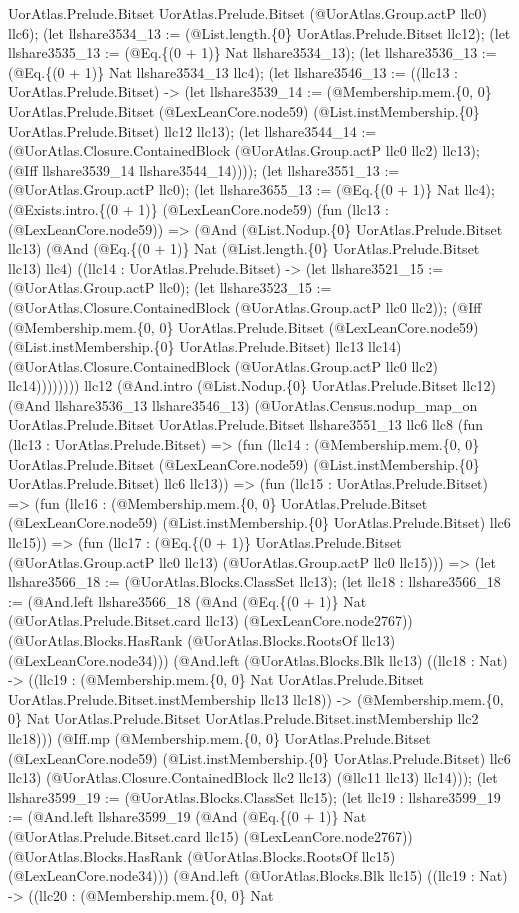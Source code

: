 \documentclass[11pt]{article}
\begin{document}
UorAtlas.Prelude.Bitset UorAtlas.Prelude.Bitset (@UorAtlas.Group.actP llc0) llc6); (let llshare3534\_13 := (@List.length.\{0\} UorAtlas.Prelude.Bitset llc12); (let llshare3535\_13 := (@Eq.\{(0 + 1)\} Nat llshare3534\_13); (let llshare3536\_13 := (@Eq.\{(0 + 1)\} Nat llshare3534\_13 llc4); (let llshare3546\_13 := ((llc13 : UorAtlas.Prelude.Bitset) -> (let llshare3539\_14 := (@Membership.mem.\{0, 0\} UorAtlas.Prelude.Bitset (@LexLeanCore.node59) (@List.instMembership.\{0\} UorAtlas.Prelude.Bitset) llc12 llc13); (let llshare3544\_14 := (@UorAtlas.Closure.ContainedBlock (@UorAtlas.Group.actP llc0 llc2) llc13); (@Iff llshare3539\_14 llshare3544\_14)))); (let llshare3551\_13 := (@UorAtlas.Group.actP llc0); (let llshare3655\_13 := (@Eq.\{(0 + 1)\} Nat llc4); (@Exists.intro.\{(0 + 1)\} (@LexLeanCore.node59) (fun (llc13 : (@LexLeanCore.node59)) => (@And (@List.Nodup.\{0\} UorAtlas.Prelude.Bitset llc13) (@And (@Eq.\{(0 + 1)\} Nat (@List.length.\{0\} UorAtlas.Prelude.Bitset llc13) llc4) ((llc14 : UorAtlas.Prelude.Bitset) -> (let llshare3521\_15 := (@UorAtlas.Group.actP llc0); (let llshare3523\_15 := (@UorAtlas.Closure.ContainedBlock (@UorAtlas.Group.actP llc0 llc2)); (@Iff (@Membership.mem.\{0, 0\} UorAtlas.Prelude.Bitset (@LexLeanCore.node59) (@List.instMembership.\{0\} UorAtlas.Prelude.Bitset) llc13 llc14) (@UorAtlas.Closure.ContainedBlock (@UorAtlas.Group.actP llc0 llc2) llc14)))))))) llc12 (@And.intro (@List.Nodup.\{0\} UorAtlas.Prelude.Bitset llc12) (@And llshare3536\_13 llshare3546\_13) (@UorAtlas.Census.nodup\_map\_on UorAtlas.Prelude.Bitset UorAtlas.Prelude.Bitset llshare3551\_13 llc6 llc8 (fun (llc13 : UorAtlas.Prelude.Bitset) => (fun (llc14 : (@Membership.mem.\{0, 0\} UorAtlas.Prelude.Bitset (@LexLeanCore.node59) (@List.instMembership.\{0\} UorAtlas.Prelude.Bitset) llc6 llc13)) => (fun (llc15 : UorAtlas.Prelude.Bitset) => (fun (llc16 : (@Membership.mem.\{0, 0\} UorAtlas.Prelude.Bitset (@LexLeanCore.node59) (@List.instMembership.\{0\} UorAtlas.Prelude.Bitset) llc6 llc15)) => (fun (llc17 : (@Eq.\{(0 + 1)\} UorAtlas.Prelude.Bitset (@UorAtlas.Group.actP llc0 llc13) (@UorAtlas.Group.actP llc0 llc15))) => (let llshare3566\_18 := (@UorAtlas.Blocks.ClassSet llc13); (let llc18 : llshare3566\_18 := (@And.left llshare3566\_18 (@And (@Eq.\{(0 + 1)\} Nat (@UorAtlas.Prelude.Bitset.card llc13) (@LexLeanCore.node2767)) (@UorAtlas.Blocks.HasRank (@UorAtlas.Blocks.RootsOf llc13) (@LexLeanCore.node34))) (@And.left (@UorAtlas.Blocks.Blk llc13) ((llc18 : Nat) -> ((llc19 : (@Membership.mem.\{0, 0\} Nat UorAtlas.Prelude.Bitset UorAtlas.Prelude.Bitset.instMembership llc13 llc18)) -> (@Membership.mem.\{0, 0\} Nat UorAtlas.Prelude.Bitset UorAtlas.Prelude.Bitset.instMembership llc2 llc18))) (@Iff.mp (@Membership.mem.\{0, 0\} UorAtlas.Prelude.Bitset (@LexLeanCore.node59) (@List.instMembership.\{0\} UorAtlas.Prelude.Bitset) llc6 llc13) (@UorAtlas.Closure.ContainedBlock llc2 llc13) (@llc11 llc13) llc14))); (let llshare3599\_19 := (@UorAtlas.Blocks.ClassSet llc15); (let llc19 : llshare3599\_19 := (@And.left llshare3599\_19 (@And (@Eq.\{(0 + 1)\} Nat (@UorAtlas.Prelude.Bitset.card llc15) (@LexLeanCore.node2767)) (@UorAtlas.Blocks.HasRank (@UorAtlas.Blocks.RootsOf llc15) (@LexLeanCore.node34))) (@And.left (@UorAtlas.Blocks.Blk llc15) ((llc19 : Nat) -> ((llc20 : (@Membership.mem.\{0, 0\} Nat 
\end{document}
